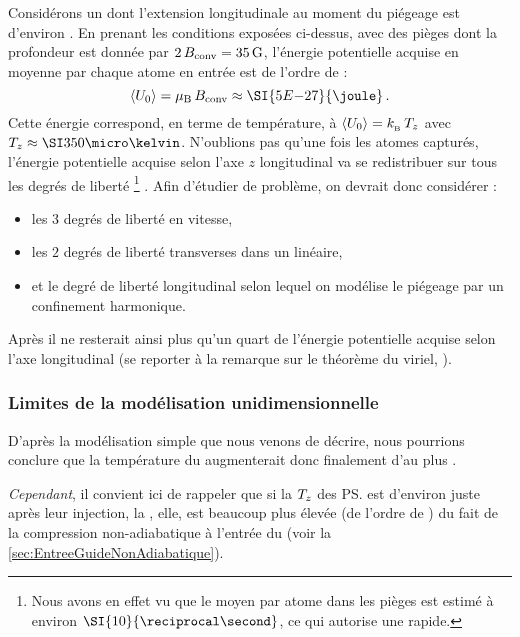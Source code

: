 \ApplicationNumerique
{Considérons un \pat dont l'extension longitudinale au moment du piégeage est d'environ . 
En prenant les conditions exposées ci-dessus, avec des pièges dont la profondeur est donnée par $2\,{B_{\rm conv}}=\SI{35}{{\rm G}}$, l'énergie potentielle acquise en moyenne par chaque atome en entrée est de l'ordre de :
\[
	\MoyenneBraKet{\ConvUaxe} 
	= \muB\,\ConvBamplit
	\approx \SI{5E{-27}}{\joule} \pointformule 
\]
Cette énergie correspond, en terme de température, à $\left\langle {U_{0}} \right\rangle = {k_{_{\rm B}}}\,T_{z}$ avec \mbox{$\Tlong \approx \microK{350}$}.
}
%
N'oublions pas qu'une fois les atomes capturés, l'énergie potentielle acquise selon l'axe $z$ longitudinal va se redistribuer sur tous les degrés de liberté%
\footnote{
Nous avons en effet vu que le \tcolel moyen par atome dans les pièges est estimé à environ $\SI{10}{\reciprocal\second}$, ce qui autorise une \reth rapide.}%
. 
Afin d'étudier de problème, on devrait donc considérer :
\begin{itemize}
	\item les $3$ degrés de liberté en vitesse,
	\item les $2$ degrés de liberté transverses dans un \pc linéaire,
	\item et le degré de liberté longitudinal selon lequel on modélise le piégeage par un confinement harmonique.
\end{itemize}
Après \reth il ne resterait ainsi plus qu'un quart de l'énergie potentielle acquise selon l'axe longitudinal (se reporter à la remarque sur le théorème du viriel, ). 

\subsubsection{Limites de la modélisation unidimensionnelle}
D'après la modélisation simple que nous venons de décrire, nous pourrions conclure que la température du \p augmenterait donc finalement d'au plus . 

\noindent \emph{Cependant}, il convient ici de rappeler que si la \templong $T_{z}$ des \ps est d'environ  juste après leur injection, la \tempt, elle, est beaucoup plus élevée (de l'ordre de ) du fait de la compression non-adiabatique à l'entrée du \gm (voir la \autoref{sec:EntreeGuideNonAdiabatique}). 


